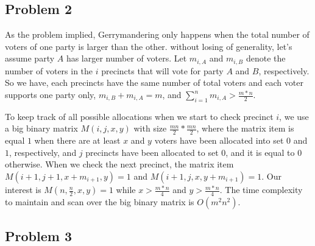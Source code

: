 \documentclass[paper=a4, fontsize=11pt]{scrartcl} %
\numberwithin{equation}{section} %
\numberwithin{figure}{section} %
\numberwithin{table}{section} %
\begin{document}

\subsection*{Problem 2}

As the problem implied, Gerrymandering only happens when the total number of voters of one party is larger than the other. without losing of generality, let's assume party $A$ has larger number of voters. Let $m_{i,A}$ and $m_{i,B}$ denote the number of voters in the $i$ precincts that will vote for party $A$ and $B$, respectively. So we have, each precincts have the same number of total voters and each voter supports one party only, $m_{i,B} + m_{i,A} = m$, and $\sum_{i=1}^n m_{i, A} > \frac{m*n}{2}$.


To keep track of all possible allocations when we start to check precinct $i$, we use a big binary matrix $M(i, j, x, y)$ with size $\frac{mn}{2}*\frac{mn}{2}$, where the matrix item is equal $1$ when there are at least $x$ and $y$ voters have been allocated into set $0$ and $1$, respectively, and $j$ precincts have been allocated to set $0$, and it is equal to $0$ otherwise. When we check the next precinct, the matrix item $M(i + 1, j + 1, x + m_{i+1}, y) = 1$ and $M(i + 1, j, x, y + m_{i+1}) = 1$. Our interest is $M(n, \frac{n}{2}, x, y) = 1$ while $ x > \frac{m*n}{4}$ and $ y > \frac{m*n}{4}$. The time complexity to maintain and scan over the big binary matrix is $O(m^2n^2)$.


\subsection*{Problem 3}
\end{document}
